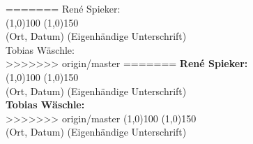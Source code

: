 =======
René Spieker:\\[1cm]
\line(1,0){100} \hfill \line(1,0){150}\\
(Ort, Datum) \hfill (Eigenhändige Unterschrift)\\[1cm]
Tobias Wäschle:\\[1cm]
>>>>>>> origin/master
=======
\textbf{René Spieker:}\\[1cm]
\line(1,0){100} \hfill \line(1,0){150}\\
(Ort, Datum) \hfill (Eigenhändige Unterschrift)\\[1cm]
\textbf{Tobias Wäschle:}\\[1cm]
>>>>>>> origin/master
\line(1,0){100} \hfill \line(1,0){150}\\
(Ort, Datum) \hfill (Eigenhändige Unterschrift)






